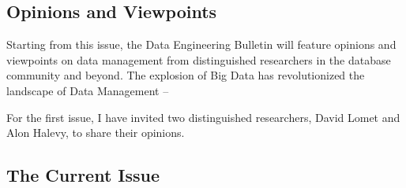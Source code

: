 \documentclass[11pt]{article}
\begin{document}
\subsection*{Opinions and Viewpoints}

Starting from this issue, the Data Engineering Bulletin will feature
opinions and viewpoints on data management from distinguished
researchers in the database community and beyond. The explosion of Big
Data has revolutionized the landscape of Data Management –

For the first issue, I have invited two distinguished researchers,
David Lomet and Alon Halevy, to share their opinions.
\subsection*{The Current Issue}
\end{document}
